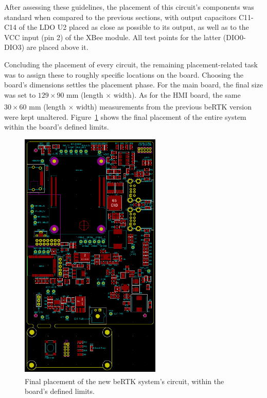 After assessing these guidelines, the placement of this circuit's components was standard when compared to the previous sections, with output capacitors C11-C14 of the LDO U2 placed as close as possible to its output, as well as to the VCC input (pin 2) of the XBee module. All test points for the latter (DIO0-DIO3) are placed above it.


Concluding the placement of every circuit, the remaining placement-related task was to assign these to roughly specific locations on the board. Choosing the board's dimensions settles the placement phase. For the main board, the final size was set to $129 \times 90$ mm (length $\times$ width). As for the HMI board, the same $30 \times 60$ mm (length $\times$ width) measurements from the previous beRTK\textsuperscript{\textregistered} version were kept unaltered. Figure~\ref{fig:placement_FULL} shows the final placement of the entire system within the board's defined limits.

\begin{figure}[h]
	\centering
	\includegraphics[width=0.6\textwidth]{Chapters/Figures/chapter5/placement_FULL.png}
	\caption{Final placement of the new beRTK\textsuperscript{\textregistered} system's circuit, within the board's defined limits.}
	\label{fig:placement_FULL}
\end{figure}



